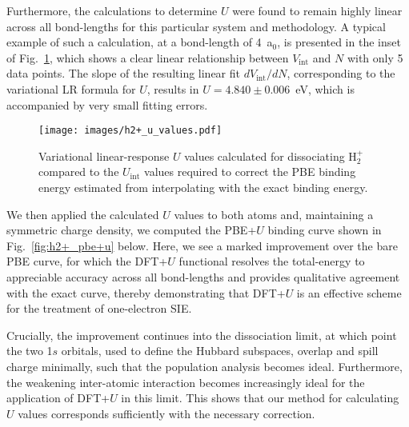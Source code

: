 Furthermore, 
the calculations to determine $U$ 
were found to remain highly linear 
across all bond-lengths 
for this particular system and methodology.
%
A typical example of such a calculation, 
at a bond-length of 4~a$_0$,
is presented in the inset of Fig.~\ref{fig:h2+_u_values}, 
which shows a clear linear relationship 
between $V_\textrm{int}$ and $N$ 
with only 5 data points.
%
The slope of the resulting linear fit 
$dV_\textrm{int}/dN$, 
corresponding to the variational LR formula for $U$, 
results in $U=4.840\pm 0.006$~eV, 
which is accompanied by very small fitting errors.  
%
%
%
\begin{figure}[th!]
\centering
\texttt{[image: images/h2+\_u\_values.pdf]}
\caption[Variational linear-response $U$ values calculated for dissociating H$_2^+$]
{Variational linear-response $U$ values 
calculated for dissociating H$_2^+$
compared to the $U_\textrm{int}$ values 
required to correct the PBE binding energy 
estimated from interpolating with the 
exact binding energy.}
\label{fig:h2+_u_values}
\end{figure}
 
%
{We then applied the calculated $U$ values to both atoms and, 
maintaining a symmetric charge density},
we computed the PBE+$U$ binding curve shown in 
Fig.~\ref{fig:h2+_pbe+u} below.
%
{
Here,
we see a marked improvement over the bare PBE curve, 
for which the DFT+$U$ functional 
resolves the total-energy to appreciable accuracy across all bond-lengths 
and provides qualitative agreement with the exact curve, 
thereby demonstrating that DFT+$U$ is an effective scheme 
for the treatment of one-electron SIE.}

{
Crucially, the improvement continues into the dissociation limit, 
at which point the two 1$s$ orbitals, 
used to define the Hubbard subspaces, 
overlap and spill charge minimally, 
such that the population analysis becomes ideal.
%
Furthermore, 
the weakening inter-atomic interaction becomes 
increasingly ideal for the application of DFT+$U$ 
in this limit.
%
This shows that our method for calculating $U$ values 
corresponds sufficiently with the necessary correction.}


